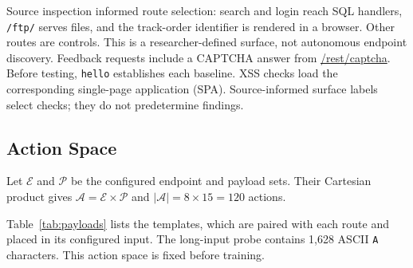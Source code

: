 \documentclass[conference, a4paper]{IEEEtran}
\begin{document}
Source inspection informed route selection: search and login reach
SQL handlers, \texttt{/ftp/} serves files, and the track-order
identifier is rendered in a browser. Other routes are controls. This
is a researcher-defined surface, not autonomous endpoint discovery.
Feedback requests include a CAPTCHA answer from \url{/rest/captcha}.
Before testing, \texttt{hello} establishes each baseline. XSS checks
load the corresponding single-page application (SPA). Source-informed
surface labels select checks; they do not predetermine findings.

\subsection{Action Space}

Let $\mathcal{E}$ and $\mathcal{P}$ be the configured endpoint
and payload sets. Their Cartesian product gives
$\mathcal{A}=\mathcal{E}\times\mathcal{P}$ and
$|\mathcal{A}|=8\times15=120$ actions.

Table~\ref{tab:payloads} lists the templates, which are paired with
each route and placed in its configured input. The long-input probe
contains 1,628 ASCII \texttt{A} characters. This action space is fixed
before training.
\end{document}
